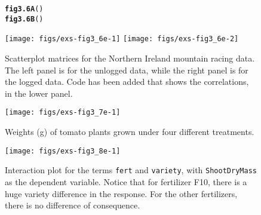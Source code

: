 \documentclass[12pt, a4paper,  BCOR=8.25mm, DIV=15]{scrartcl}\usepackage[]{graphicx}\usepackage[]{color}
\makeatletter
\newcommand{\hlstd}[1]{\textcolor[rgb]{0.345,0.345,0.345}{#1}}%
\newcommand{\hlkwd}[1]{\textcolor[rgb]{0.737,0.353,0.396}{\textbf{#1}}}%
\newenvironment{kframe}{%
 \def\at@end@of@kframe{}%
 \ifinner\ifhmode%
  \def\at@end@of@kframe{\end{minipage}}%
  \begin{minipage}{\columnwidth}%
 \fi\fi%
 \def\FrameCommand##1{\hskip\@totalleftmargin \hskip-\fboxsep
 \colorbox{shadecolor}{##1}\hskip-\fboxsep
     \hskip-\linewidth \hskip-\@totalleftmargin \hskip\columnwidth}%
 \MakeFramed {\advance\hsize-\width
   \@totalleftmargin\z@ \linewidth\hsize
   \@setminipage}}%
 {\par\unskip\endMakeFramed%
 \at@end@of@kframe}
\newenvironment{knitrout}{}{} %
\newcommand{\txtt}[1]{{\texttt{#1}}}
\makeatother
\begin{document}
\begin{figure}
\vspace*{-6pt}
\begin{knitrout}
\color{fgcolor}\begin{kframe}
\begin{alltt}
\hlkwd{fig3.6A}\hlstd{()}
\hlkwd{fig3.6B}\hlstd{()}
\end{alltt}
\end{kframe}

{\centering \texttt{[image: figs/exs-fig3\_6e-1]} 
\texttt{[image: figs/exs-fig3\_6e-2]} 

}



\end{knitrout}
\caption{Scatterplot matrices for the Northern Ireland mountain racing
  data. The left panel is for the unlogged data, while the right panel is
for the logged data.  Code has been added that shows the correlations,
in the lower panel.\label{fig:nimra}}
\end{figure}

\begin{figure}
\vspace*{-6pt}
\begin{knitrout}
\color{fgcolor}

{\centering \texttt{[image: figs/exs-fig3\_7e-1]} 

}



\end{knitrout}
\caption{Weights (g) of tomato plants grown under four different
  treatments.\label{fig:Tomato}}
\end{figure}

\begin{figure}
\begin{knitrout}
\color{fgcolor}

{\centering \texttt{[image: figs/exs-fig3\_8e-1]} 

}



\end{knitrout}
    \caption{Interaction plot for the terms \txtt{fert} and
      \txtt{variety}, with \txtt{ShootDryMass} as the dependent
      variable. Notice that for fertilizer F10, there is a huge
      variety difference in the response. For the other fertilizers,
      there is no difference of consequence.\label{fig:rice-interact}}
\end{figure}
\end{document}
